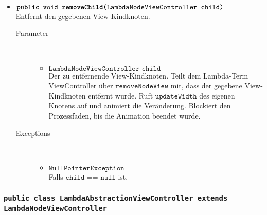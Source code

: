 \begin{description}
\begin{itemize}
		\item $\texttt{public void \textbf{removeChild}(LambdaNodeViewController child)}$ \\ Entfernt den gegebenen View-Kindknoten.
		\begin{description}
			\item[Parameter] \hfill \\
			\vspace{-.8cm}
			\begin{itemize}
				\item $\texttt{LambdaNodeViewController child}$ \\ Der zu entfernende View-Kindknoten. Teilt dem Lambda-Term ViewController über $\texttt{removeNodeView}$ mit, dass der gegebene View-Kindknoten entfernt wurde. Ruft $\texttt{updateWidth}$ des eigenen Knotens auf und animiert die Veränderung. Blockiert den Prozessfaden, bis die Animation beendet wurde.
			\end{itemize}
			\item[Exceptions] \hfill \\
			\vspace{-.8cm}
			\begin{itemize}
				\item $\texttt{NullPointerException}$ \\ Falls $\texttt{child == null}$ ist.
			\end{itemize}
		\end{description}
	\end{itemize}
\end{description}

\subsubsection{\normalfont \texttt{public class \textbf{LambdaAbstractionViewController} extends LambdaNodeViewController}}

